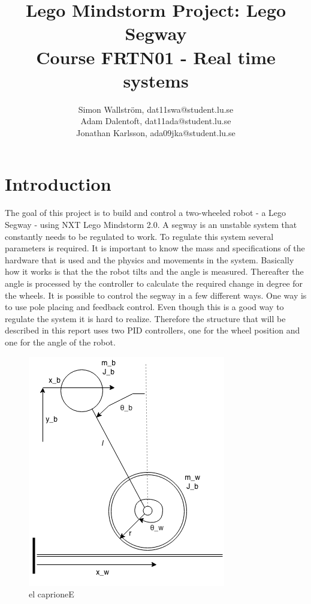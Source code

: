 \documentclass[a4paper]{article}
\title{Lego Mindstorm Project: Lego Segway\\
Course FRTN01 - Real time systems}
\author{Simon Wallström, dat11swa@student.lu.se\\
Adam Dalentoft, dat11ada@student.lu.se\\
Jonathan Karlsson, ada09jka@student.lu.se}
\begin{document}

\maketitle
\thispagestyle{empty}
\newpage
\setcounter{page}{1}
\tableofcontents
\newpage
\section{Introduction}
The goal of this project is to build and control a two-wheeled robot - a Lego Segway - using NXT Lego Mindstorm 2.0. A segway is an unstable system that constantly needs to be regulated to work. To regulate this system several parameters is required. It is important to know the mass and specifications of the hardware that is used and the physics and movements in the system. Basically how it works is that the the robot tilts and the angle is measured. Thereafter the angle is processed by the controller to calculate the required change in degree for the wheels. It is possible to control the segway in a few different ways. One way is to use pole placing and feedback control. Even though this is a good way to regulate the system it is hard to realize. Therefore the structure that will be described in this report uses two PID controllers, one for the wheel position and one for the angle of the robot.\\

\begin{figure}[H]
  \centering
\includegraphics[scale=0.8]{pic/segway.png}
\caption{el caprioneE}
\end{figure}
\end{document}
